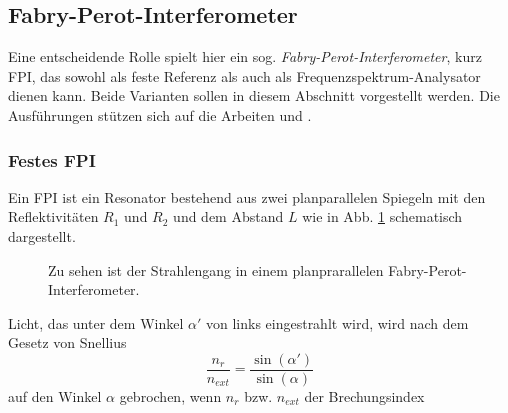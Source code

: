 \subsection{Fabry-Perot-Interferometer}\label{subsec:fabry-perot-interferometer}
Eine entscheidende Rolle spielt hier ein sog.
\textit{Fabry-Perot-Interferometer}, kurz FPI, das sowohl
als feste Referenz als auch als Frequenzspektrum-Analysator dienen kann.
Beide Varianten sollen in diesem Abschnitt vorgestellt werden. Die Ausführungen
stützen sich auf die Arbeiten \cite{wiche:1997:diplomarbeit} und
\cite{kuschnick:2000:diplomarbeit}.

\subsubsection{Festes FPI}\label{subsubsec:festes_FPI}
Ein FPI ist ein Resonator bestehend aus zwei planparallelen Spiegeln mit den
Reflektivitäten $R_1$ und $R_2$ und dem Abstand $L$ wie in Abb.
\ref{fig:FPI_planparallel} schematisch dargestellt.
\begin{figure}[h]
 	\centering
	\caption[FPI - planparallel]{Zu sehen ist der Strahlengang in einem
	planprarallelen Fabry-Perot-Interferometer.}\label{fig:FPI_planparallel}
\end{figure}
Licht, das unter dem Winkel
$\alpha'$ von links eingestrahlt wird, wird nach dem Gesetz von Snellius
\begin{equation}\label{eq:snellius}
	\frac{n_r}{n_{ext}}=\frac{\sin{(\alpha')}}{\sin{(\alpha)}}
\end{equation}
auf den Winkel $\alpha$ gebrochen, wenn $n_r$ bzw. $n_{ext}$ der Brechungsindex
